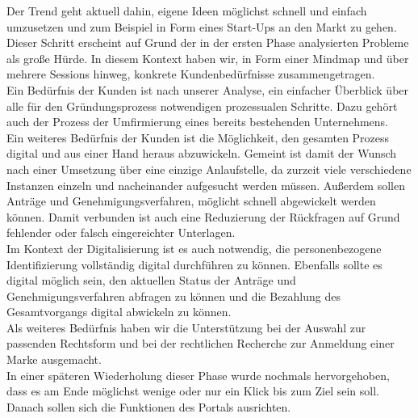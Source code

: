 Der Trend geht aktuell dahin, eigene Ideen möglichst schnell und einfach umzusetzen und zum Beispiel in Form eines Start-Ups an den Markt zu gehen. Dieser Schritt erscheint auf Grund der in der ersten Phase analysierten Probleme als große Hürde. In diesem Kontext haben wir, in Form einer Mindmap und über mehrere Sessions hinweg, konkrete Kundenbedürfnisse zusammengetragen.\\
Ein Bedürfnis der Kunden ist nach unserer Analyse, ein einfacher Überblick über alle für den Gründungsprozess notwendigen prozessualen Schritte. Dazu gehört auch der Prozess der Umfirmierung eines bereits bestehenden Unternehmens.\\
Ein weiteres Bedürfnis der Kunden ist die Möglichkeit, den gesamten Prozess digital und aus einer Hand heraus abzuwickeln. Gemeint ist damit der Wunsch nach einer Umsetzung über eine einzige Anlaufstelle, da zurzeit viele verschiedene Instanzen einzeln und nacheinander aufgesucht werden müssen. Außerdem sollen Anträge und Genehmigungsverfahren, möglicht schnell abgewickelt werden können. Damit verbunden ist auch eine Reduzierung der Rückfragen auf Grund fehlender oder falsch eingereichter Unterlagen.\\
Im Kontext der Digitalisierung ist es auch notwendig, die personenbezogene Identifizierung vollständig digital durchführen zu können. Ebenfalls sollte es digital möglich sein, den aktuellen Status der Anträge und Genehmigungsverfahren abfragen zu können und die Bezahlung des Gesamtvorgangs digital abwickeln zu können.\\
Als weiteres Bedürfnis haben wir die Unterstützung bei der Auswahl zur passenden Rechtsform und bei der rechtlichen Recherche zur Anmeldung einer Marke ausgemacht.\\
In einer späteren Wiederholung dieser Phase wurde nochmals hervorgehoben, dass es am Ende möglichst wenige oder nur ein Klick bis zum Ziel sein soll. Danach sollen sich die Funktionen des Portals ausrichten.\\